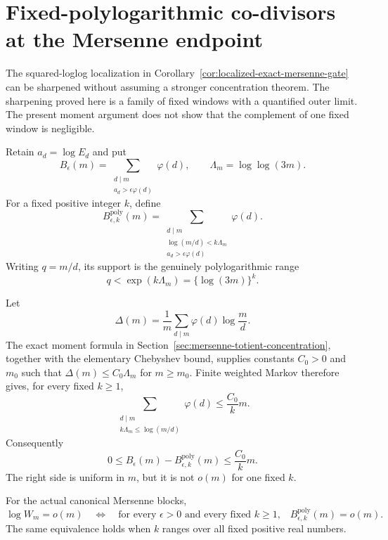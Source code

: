 \section{Fixed-polylogarithmic co-divisors at the Mersenne endpoint}
\label{sec:mersenne-polylog-codivisor}

The squared-loglog localization in
Corollary~\ref{cor:localized-exact-mersenne-gate} can be sharpened without
assuming a stronger concentration theorem.  The sharpening proved here is a
family of fixed windows with a quantified outer limit.  The present moment
argument does not show that the complement of one fixed window is negligible.

Retain $a_d=\log E_d$ and put
\[
 B_\epsilon(m)=
   \sum_{\substack{d\mid m\\a_d>\epsilon\varphi(d)}}\varphi(d),
 \qquad \Lambda_m=\log\log(3m).
\]
For a fixed positive integer $k$, define
\[
 B^{\mathrm{poly}}_{\epsilon,k}(m)=
 \sum_{\substack{d\mid m\\
       \log(m/d)<k\Lambda_m\\a_d>\epsilon\varphi(d)}}\varphi(d).
\]
Writing $q=m/d$, its support is the genuinely polylogarithmic range
\[
             q<\exp(k\Lambda_m)=\{\log(3m)\}^{k}.
\]

Let
\[
 \Delta(m)=\frac1m\sum_{d\mid m}\varphi(d)\log\frac md.
\]
The exact moment formula in
Section~\ref{sec:mersenne-totient-concentration}, together with the
elementary Chebyshev bound, supplies constants $C_0>0$ and $m_0$ such that
 $\Delta(m)\le C_0\Lambda_m$ for $m\ge m_0$.  Finite weighted Markov therefore
gives, for every fixed $k\ge1$,
\begin{equation}\label{eq:fixed-polylog-far-tail}
 \sum_{\substack{d\mid m\\k\Lambda_m\le\log(m/d)}}\varphi(d)
 \le \frac{C_0}{k}m.
\end{equation}
Consequently
\begin{equation}\label{eq:polylog-exceptional-approximation}
 0\le B_\epsilon(m)-B^{\mathrm{poly}}_{\epsilon,k}(m)
 \le\frac{C_0}{k}m.
\end{equation}
The right side is uniform in $m$, but it is not $o(m)$ for one fixed $k$.

\begin{theorem}
\label{thm:fixed-polylog-mersenne-gate}
For the actual canonical Mersenne blocks,
\[
 \log W_m=o(m)
 \quad\Longleftrightarrow\quad
 \text{for every $\epsilon>0$ and every fixed $k\ge1$,}\quad
 B^{\mathrm{poly}}_{\epsilon,k}(m)=o(m).
\]
The same equivalence holds when $k$ ranges over all fixed positive real
numbers.
\end{theorem}

